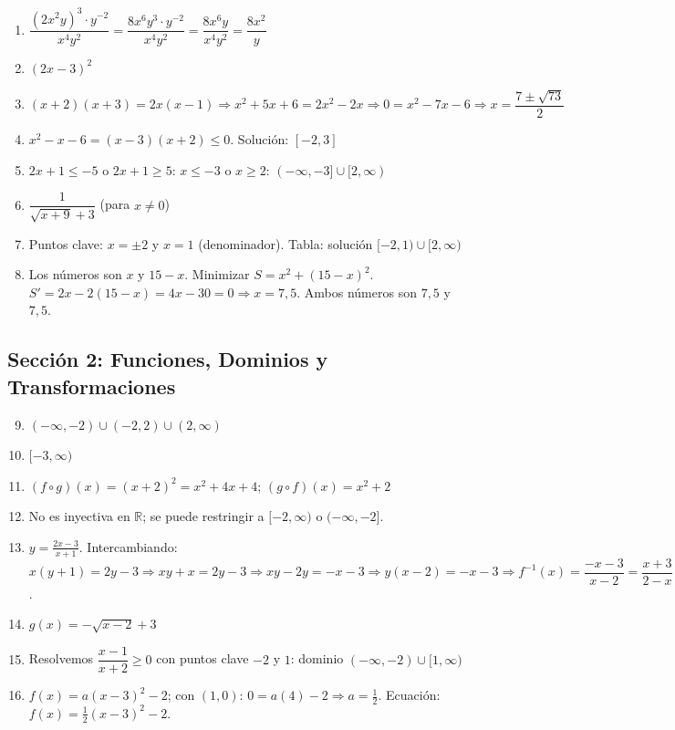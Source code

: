 \documentclass[12pt, a4paper]{article}
\begin{document}
\begin{enumerate}[leftmargin=*, label=\textbf{\arabic*.}]
  \item $\dfrac{(2x^2y)^3 \cdot y^{-2}}{x^4 y^2} = \dfrac{8x^6 y^3 \cdot y^{-2}}{x^4 y^2} = \dfrac{8x^6 y}{x^4 y^2} = \dfrac{8x^2}{y}$
  \item $(2x - 3)^2$
  \item $(x + 2)(x + 3) = 2x(x - 1) \Rightarrow x^2 + 5x + 6 = 2x^2 - 2x \Rightarrow 0 = x^2 - 7x - 6 \Rightarrow x = \dfrac{7 \pm \sqrt{73}}{2}$
  \item $x^2 - x - 6 = (x - 3)(x + 2) \leq 0.$ Solución: $[-2, 3]$
  \item $2x + 1 \leq -5$ o $2x + 1 \geq 5$: $x \leq -3$ o $x \geq 2$: $(-\infty, -3] \cup [2, \infty)$
  \item $\dfrac{1}{\sqrt{x + 9} + 3}$ (para $x \neq 0$)
  \item Puntos clave: $x = \pm 2$ y $x = 1$ (denominador). Tabla: solución $[-2, 1) \cup [2, \infty)$
  \item Los números son $x$ y $15 - x$. Minimizar $S = x^2 + (15 - x)^2$. $S' = 2x - 2(15 - x) = 4x - 30 = 0 \Rightarrow x = 7{,}5$. Ambos números son $7{,}5$ y $7{,}5$.
\end{enumerate}

\subsection*{Sección 2: Funciones, Dominios y Transformaciones}

\begin{enumerate}[leftmargin=*, label=\textbf{\arabic*.}]
  \setcounter{enumi}{8}
  \item $(-\infty, -2) \cup (-2, 2) \cup (2, \infty)$
  \item $[-3, \infty)$
  \item $(f \circ g)(x) = (x + 2)^2 = x^2 + 4x + 4$; $(g \circ f)(x) = x^2 + 2$
  \item No es inyectiva en $\mathbb{R}$; se puede restringir a $[-2, \infty)$ o $(-\infty, -2]$.
  \item $y = \frac{2x - 3}{x + 1}$. Intercambiando: $x(y + 1) = 2y - 3 \Rightarrow xy + x = 2y - 3 \Rightarrow xy - 2y = -x - 3 \Rightarrow y(x - 2) = -x - 3 \Rightarrow f^{-1}(x) = \dfrac{-x - 3}{x - 2} = \dfrac{x + 3}{2 - x}$.
  \item $g(x) = -\sqrt{x - 2} + 3$
  \item Resolvemos $\dfrac{x - 1}{x + 2} \geq 0$ con puntos clave $-2$ y $1$: dominio $(-\infty, -2) \cup [1, \infty)$
  \item $f(x) = a(x - 3)^2 - 2$; con $(1, 0)$: $0 = a(4) - 2 \Rightarrow a = \frac{1}{2}$. Ecuación: $f(x) = \frac{1}{2}(x - 3)^2 - 2$.
\end{enumerate}
\end{document}
